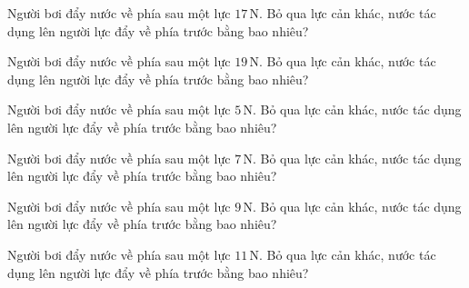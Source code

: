 \begin{ex}
Người bơi đẩy nước về phía sau một lực $17\,\text{N}$. Bỏ qua lực cản khác, nước tác dụng lên người lực đẩy về phía trước bằng bao nhiêu?
\end{ex}

\begin{ex}
Người bơi đẩy nước về phía sau một lực $19\,\text{N}$. Bỏ qua lực cản khác, nước tác dụng lên người lực đẩy về phía trước bằng bao nhiêu?
\end{ex}

\begin{ex}
Người bơi đẩy nước về phía sau một lực $5\,\text{N}$. Bỏ qua lực cản khác, nước tác dụng lên người lực đẩy về phía trước bằng bao nhiêu?
\end{ex}

\begin{ex}
Người bơi đẩy nước về phía sau một lực $7\,\text{N}$. Bỏ qua lực cản khác, nước tác dụng lên người lực đẩy về phía trước bằng bao nhiêu?
\end{ex}

\begin{ex}
Người bơi đẩy nước về phía sau một lực $9\,\text{N}$. Bỏ qua lực cản khác, nước tác dụng lên người lực đẩy về phía trước bằng bao nhiêu?
\end{ex}

\begin{ex}
Người bơi đẩy nước về phía sau một lực $11\,\text{N}$. Bỏ qua lực cản khác, nước tác dụng lên người lực đẩy về phía trước bằng bao nhiêu?
\end{ex}

